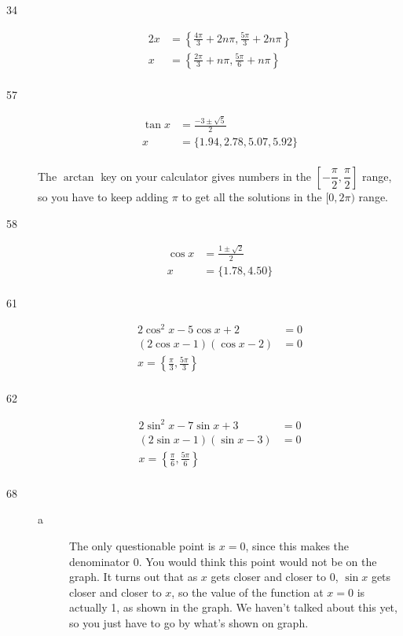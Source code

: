 \documentclass[fleqn,addpoints]{exam}
\begin{document}
\begin{description}
\item[34]
\begin{align*}
  2x &= \left\{\frac{4 \pi}{3} + 2n\pi, \frac{5 \pi}{3} + 2n\pi \right\} \\
  x &= \left\{\frac{2 \pi}{3} + n\pi, \frac{5 \pi}{6} + n\pi \right\} \\
\end{align*} 

\item[57]
\begin{align*}
  \tan x &= \frac{-3 \pm \sqrt{5}}{2} \\
  x &= \{ 1.94, 2.78, 5.07, 5.92 \} \\
\end{align*} 

The $\arctan$ key on your calculator gives numbers in the $\left[ - \dfrac{\pi}{2}, \dfrac{\pi}{2} \right]$ range, so
you have to keep adding $\pi$ to get all the solutions in the $[0, 2\pi)$ range. 

\item[58]
\begin{align*}
  \cos x &= \frac{1 \pm \sqrt{2}}{2} \\
  x &= \{ 1.78, 4.50 \} \\
\end{align*} 

\item[61]
\begin{align*}
  2 \cos^2 x - 5 \cos x +2 &= 0 \\
  (2 \cos x - 1)(\cos x - 2) &= 0 \\
  x = \left\{ \frac{\pi}{3}, \frac{5 \pi}{3} \right\} \\
\end{align*} 

\item[62]
\begin{align*}
  2 \sin^2 x - 7 \sin x + 3 &= 0 \\
  (2 \sin x - 1)(\sin x - 3) &= 0 \\
  x = \left\{ \frac{\pi}{6}, \frac{5 \pi}{6} \right\} \\
\end{align*} 

\item[68]
\begin{description}

\item[a]
The only questionable point is $x=0$, since this makes the denominator 0.  You would think this point would not be on
the graph.  It turns out that as $x$ gets closer and closer to 0, $\sin x$ gets closer and closer to $x$, so the
value of the function at $x=0$ is actually 1, as shown in the graph.  We haven't talked about this yet, so you just have
to go by what's shown on graph.


\end{description}
\end{description}
\end{document}
